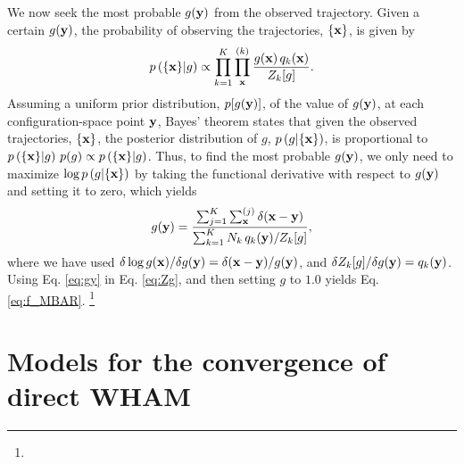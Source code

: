\documentclass[aip,jcp,preprint,superscriptaddress]{revtex4-1}
\begin{document}
We now seek the most probable $g(\mathbf{y})$
from the observed trajectory.
%
Given a certain $g(\mathbf{y})$,
the probability of observing the trajectories,
$\{ \mathbf{x} \}$,
is given by
%
\begin{equation*}
p\left( \{ \mathbf{x} \} | g \right)
\propto
\prod_{k = 1}^K
\prod_{\mathbf{x}}^{(k)}
\frac{ g(\mathbf{x}) \, q_k(\mathbf{x}) }
     { Z_k[g] }.
\end{equation*}
%
Assuming a uniform prior distribution,
$p[g(\mathbf{y})]$, of the value of $g(\mathbf{y})$,
at each configuration-space point $\mathbf{y}$,
Bayes' theorem\cite{leonard} states that
given the observed trajectories, $\{\mathbf{x}\}$,
the posterior distribution of $g$,
$p\left( g | \{ \mathbf{x} \} \right)$,
is proportional to
$p\left( \{ \mathbf{x} \} | g \right) \, p(g) \propto p\left( \{ \mathbf{x} \} | g \right)$.
%
Thus,
to find the most probable $g(\mathbf{y})$,
we only need to maximize
$\log p\left( g | \{ \mathbf{x} \} \right)$
by taking the functional derivative
with respect to $g(\mathbf{y})$
and setting it to zero,
which yields
%
\begin{equation}
g(\mathbf{y})
=
\frac{
  \sum_{j = 1}^K \sum_{\mathbf{x}}^{(j)} \delta(\mathbf{x} - \mathbf{y})
}
{
  \sum_{k = 1}^K N_k \, q_k(\mathbf{y}) / Z_k[g]
},
\label{eq:gy}
\end{equation}
%
where we have used
$\delta \log g(\mathbf{x}) / \delta g(\mathbf{y}) = \delta(\mathbf{x} - \mathbf{y})/g(\mathbf{y})$,
and
$\delta Z_k[g] / \delta g(\mathbf{y}) = q_k(\mathbf{y})$.
%
Using Eq. \eqref{eq:gy}
in Eq. \eqref{eq:Zg},
and then setting $g$ to $1.0$
yields Eq. \eqref{eq:f_MBAR}.
%
\footnote{}




\section{\label{sec:convwham}
Models for the convergence of direct WHAM}



\end{document}
